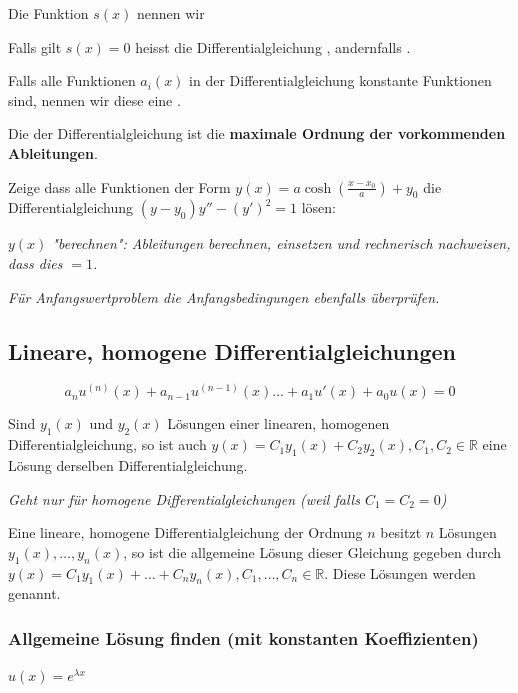 Die Funktion $s(x)$ nennen wir 

Falls gilt $s(x)=0$ heisst die Differentialgleichung , andernfalls .

Falls alle Funktionen $a_i(x)$ in der Differentialgleichung konstante Funktionen sind, nennen wir diese eine .

Die  der Differentialgleichung ist die \textbf{maximale Ordnung der vorkommenden Ableitungen}.

\begin{exercise}
    Zeige dass alle Funktionen der Form $y(x)=a \cosh (\frac{x-x_0}{a})+y_0$ die Differentialgleichung $(y-y_0)y''-(y')^2 = 1$ lösen:

    \textit{$y(x)$ "berechnen": Ableitungen berechnen, einsetzen und rechnerisch nachweisen, dass dies $=1$.}

    \textit{Für Anfangswertproblem die Anfangsbedingungen ebenfalls überprüfen.}
\end{exercise}

\subsection{Lineare, homogene Differentialgleichungen}
$$a_n u^{(n)}(x) + a_{n-1} u^{(n-1)}(x) \dots + a_1 u'(x) + a_0 u(x) = 0$$

Sind $y_1(x)$ und $y_2(x)$ Lösungen einer linearen, homogenen Differentialgleichung, so ist auch $y(x)=C_1y_1(x)+C_2y_2(x), C_1, C_2 \in \mathbb{R}$ eine Lösung derselben Differentialgleichung.

\textit{Geht nur für homogene Differentialgleichungen (weil falls $C_1=C_2=0$)}

Eine lineare, homogene Differentialgleichung der Ordnung $n$ besitzt $n$ Lösungen $y_1(x), \dots, y_n(x)$, so ist die allgemeine Lösung dieser Gleichung gegeben durch $y(x)=C_1y_1(x)+\dots+C_ny_n(x), C_1, \dots, C_n \in \mathbb{R}$.
Diese Lösungen werden  genannt.

\subsubsection{Allgemeine Lösung finden (mit konstanten Koeffizienten)}

 $u(x)=e^{\lambda x}$

